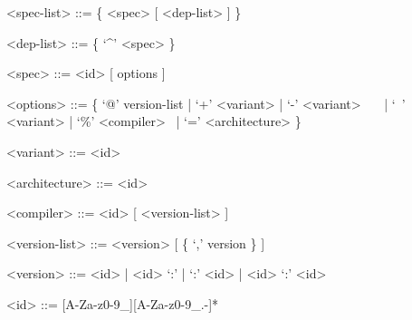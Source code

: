   <spec-list> ::= \{ <spec> [ <dep-list> ] \}
  
  <dep-list>  ::= \{ `\textsf \textasciicircum' <spec> \}

  <spec>      ::= <id> [ options ]
  
  <options>   ::= \{ `@' version-list | `+' <variant> \newline
                  | `-' <variant> ~~~| `~' <variant> \newline
                  | `\%' <compiler> ~| `=' <architecture> \}
                  
  <variant>      ::= <id>

  <architecture> ::= <id>

  <compiler>     ::= <id> [ <version-list> ]

  <version-list> ::= <version> [ \{ `,' version \} ]

  <version>      ::= <id> | <id> `:' | `:' <id> | <id> `:' <id>

  <id>           ::= [A-Za-z0-9_][A-Za-z0-9_.-]*  